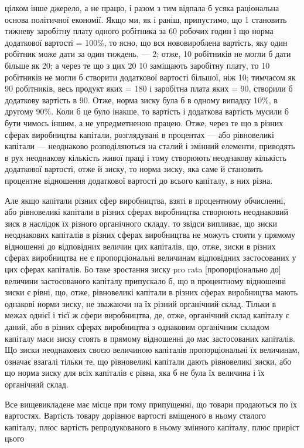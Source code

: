 \parcont{}  %
цілком інше джерело, а не працю, і разом з тим відпала б
усяка раціональна основа політичної економії. Якщо ми, як і раніш, припустимо, що 1
становить тижневу заробітну плату одного робітника за 60 робочих годин і що норма
додаткової вартості = 100\%, то ясно, що вся нововироблена
вартість, яку один робітник може дати за один тиждень, — 2; отже, 10 робітників не
могли б дати більше як
20; а через те що з цих 20
10 заміщають заробітну плату, то 10 робітників не могли б створити додаткової
вартості більшої, ніж
10; тимчасом як 90 робітників, весь продукт
яких = 180 і заробітна плата яких = 90, створили б додаткову
вартість в 90. Отже, норма зиску була б в одному випадку 10\%, в другому 90\%. Коли
б це було інакше, то вартість і додаткова
вартість мусили б бути чимось іншим, а не упредметненою
працею. Отже, через те що в різних сферах виробництва капітали, розглядувані в процентах — або
рівновеликі капітали —
неоднаково розподіляються на сталий і змінний елементи, приводять в рух неоднакову кількість живої
праці і тому створюють
неоднакову кількість додаткової вартості, отже й зиску, то
норма зиску, яка саме й становить процентне відношення додаткової вартості до всього капіталу, в них
різна.

Але якщо капітали різних сфер виробництва, взяті в процентному обчисленні, або рівновеликі капітали
в різних сферах
виробництва створюють неоднаковий зиск в наслідок їх різного
органічного складу, то звідси випливає, що зиски неоднакових
капіталів в різних сферах виробництва не можуть стояти у
прямому відношенні до відповідних величин цих капіталів,
що, отже, зиски в різних сферах виробництва не є пропорціональні величинам відповідних застосованих
у цих сферах капіталів. Бо таке зростання зиску pro rata [пропорціонально до] величини застосованого
капіталу припускало б, що в процентному відношенні зиски є рівні, що, отже, рівновеликі капітали
в різних сферах виробництва мають однакові норми зиску, не
зважаючи на їх різний органічний склад. Тільки в межах однієї
і тієї ж сфери виробництва, де, отже, органічний склад капіталу є даний, або в різних сферах
виробництва з однаковим
органічним складом капіталу маси зиску стоять в прямому відношенні до мас застосованих капіталів. Що
зиски неоднакових
своєю величиною капіталів пропорціональні їх величинам, означає
взагалі тільки те, що рівновеликі капітали дають рівновеликі
зиски, або що норма зиску для всіх капіталів є рівна, яка б
не була їх величина і їх органічний склад.

Все вищевикладене має місце при тому припущенні, що товари продаються по їх вартостях. Вартість
товару дорівнює
вартості вміщеного в ньому сталого капіталу, плюс вартість
репродукованого в ньому змінного капіталу, плюс приріст цього
\parbreak{}  %
